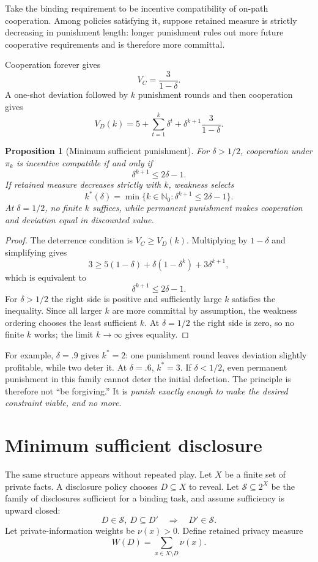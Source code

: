 \documentclass[11pt]{article}
\newtheorem{proposition}[theorem]{Proposition}
\theoremstyle{definition}
\begin{document}
Take the binding requirement to be incentive compatibility of on-path cooperation. Among policies satisfying it, suppose retained measure is strictly decreasing in punishment length: longer punishment rules out more future cooperative requirements and is therefore more committal.

Cooperation forever gives
\[
V_C=\frac{3}{1-\delta}.
\]
A one-shot deviation followed by $k$ punishment rounds and then cooperation gives
\[
V_D(k)=5+\sum_{t=1}^{k}\delta^t+\delta^{k+1}\frac{3}{1-\delta}.
\]

\begin{proposition}[Minimum sufficient punishment]\label{prop:punishment}
For $\delta>1/2$, cooperation under $\pi_k$ is incentive compatible if and only if
\[
\delta^{k+1}\le2\delta-1.
\]
If retained measure decreases strictly with $k$, weakness selects
\[
k^*(\delta)=\min\{k\in\mathbb N_0:\delta^{k+1}\le2\delta-1\}.
\]
At $\delta=1/2$, no finite $k$ suffices, while permanent punishment makes cooperation and deviation equal in discounted value.
\end{proposition}

\begin{proof}
The deterrence condition is $V_C\ge V_D(k)$. Multiplying by $1-\delta$ and simplifying gives
\[
3\ge5(1-\delta)+\delta(1-\delta^k)+3\delta^{k+1},
\]
which is equivalent to
\[
\delta^{k+1}\le2\delta-1.
\]
For $\delta>1/2$ the right side is positive and sufficiently large $k$ satisfies the inequality. Since all larger $k$ are more committal by assumption, the weakness ordering chooses the least sufficient $k$. At $\delta=1/2$ the right side is zero, so no finite $k$ works; the limit $k\to\infty$ gives equality.
\end{proof}

For example, $\delta=.9$ gives $k^*=2$: one punishment round leaves deviation slightly profitable, while two deter it. At $\delta=.6$, $k^*=3$. If $\delta<1/2$, even permanent punishment in this family cannot deter the initial defection. The principle is therefore not ``be forgiving.'' It is \emph{punish exactly enough to make the desired constraint viable, and no more}.

\section{Minimum sufficient disclosure}

The same structure appears without repeated play. Let $X$ be a finite set of private facts. A disclosure policy chooses $D\subseteq X$ to reveal. Let $\mathcal S\subseteq2^X$ be the family of disclosures sufficient for a binding task, and assume sufficiency is upward closed:
\[
D\in\mathcal S,\ D\subseteq D'\quad\Longrightarrow\quad D'\in\mathcal S.
\]
Let private-information weights be $\nu(x)>0$. Define retained privacy measure
\[
W(D)=\sum_{x\in X\setminus D}\nu(x).
\]
\end{document}
